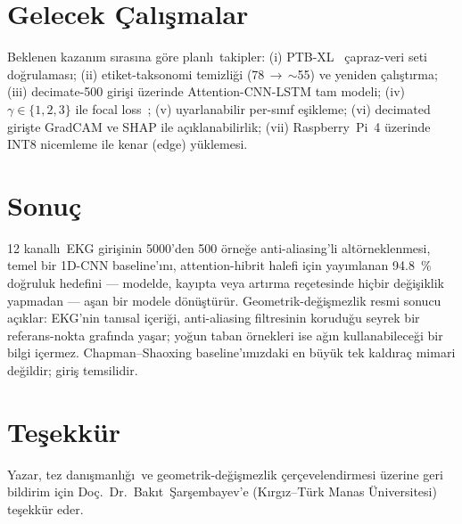 \documentclass[conference]{IEEEtran}
\begin{document}
\section{Gelecek \c{C}al\i\c{s}malar}
Beklenen kazan\i m s\i ras\i na g\"{o}re planl\i\ takipler:
(i) PTB-XL~\cite{wagner2020} \c{c}apraz-veri seti do\u{g}rulamas\i;
(ii) etiket-taksonomi temizli\u{g}i (\num{78}\,$\rightarrow$\,$\sim$55) ve
yeniden \c{c}al\i\c{s}t\i rma; (iii) decimate-\num{500} giri\c{s}i \"{u}zerinde
Attention-CNN-LSTM tam modeli; (iv) $\gamma\in\{1,2,3\}$ ile focal
loss~\cite{lin2017}; (v) uyarlanabilir per-s\i n\i f e\c{s}ikleme;
(vi) decimated giri\c{s}te GradCAM ve SHAP ile a\c{c}\i klanabilirlik;
(vii) Raspberry~Pi~4 \"{u}zerinde INT8 nicemleme ile kenar (edge)
y\"{u}klemesi.

\section{Sonu\c{c}}
12 kanall\i\ EKG giri\c{s}inin \num{5000}'den \num{500} \"{o}rne\u{g}e
anti-aliasing'li alt\"{o}rneklenmesi, temel bir 1D-CNN baseline'\i n\i,
attention-hibrit halefi i\c{c}in yay\i mlanan \SI{94,8}{\percent}
do\u{g}ruluk hedefini --- modelde, kay\i pta veya art\i rma re\c{c}etesinde
hi\c{c}bir de\u{g}i\c{s}iklik yapmadan --- a\c{s}an bir modele
d\"{o}n\"{u}\c{s}t\"{u}r\"{u}r. Geometrik-de\u{g}i\c{s}mezlik resmi sonucu a\c{c}\i klar:
EKG'nin tan\i sal i\c{c}eri\u{g}i, anti-aliasing filtresinin korudu\u{g}u
seyrek bir referans-nokta graf\i nda ya\c{s}ar; yo\u{g}un taban \"{o}rnekleri
ise a\u{g}\i n kullanabilece\u{g}i bir bilgi i\c{c}ermez.
Chapman--Shaoxing baseline'\i m\i zdaki en b\"{u}y\"{u}k tek kald\i ra\c{c} mimari
de\u{g}ildir; giri\c{s} temsilidir.

\section*{Te\c{s}ekk\"{u}r}
Yazar, tez dan\i\c{s}manl\i\u{g}\i\ ve geometrik-de\u{g}i\c{s}mezlik
\c{c}er\c{c}evelendirmesi \"{u}zerine geri bildirim i\c{c}in
Do\c{c}.\ Dr.\ Bak\i t\ \c{S}ar\c{s}embayev'e (K\i rg\i z--T\"{u}rk Manas
\"{U}niversitesi) te\c{s}ekk\"{u}r eder.
\end{document}

